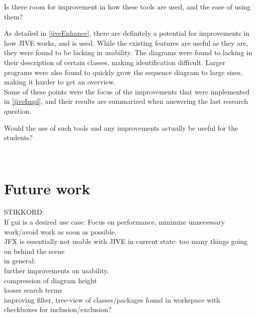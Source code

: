 \begin{theorem}
Is there room for improvement in how these tools are used, and the ease of using them?
\end{theorem}

As detailed in \autoref{jiveEnhance}, there are definitely a potential for improvements in how JIVE works, and is used.
While the existing features are useful as they are, they were found to be lacking in usability.
The diagrams were found to lacking in their description of certain classes, making identification difficult.
Larger programs were also found to quickly grow the sequence diagram to large sizes, making it harder to get an overview.
~\\

Some of these points were the focus of the improvements that were implemented in \autoref{jiveImpl}, and their results are summarized when answering the last research question.
~\\

\begin{theorem}
Would the use of such tools and any improvements actually be useful for the students?
\end{theorem}
~\\

\section{Future work}\label{conclusionFuture}
STIKKORD:\\
If gui is a desired use case: Focus on performance, minimize unnecessary work/avoid work as soon as possible.\\
JFX is essentially not usable with JIVE in current state: too many things going on behind the scene\\

in general:\\
further improvements on usability.\\
compression of diagram height\\
looser search terms\\
improving filter, tree-view of classes/packages found in workspace with checkboxes for inclusion/exclusion?\\

